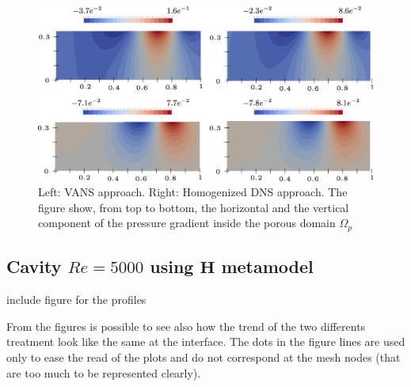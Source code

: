 \begin{figure}[h]
	\centering
	\includegraphics[width=1\linewidth]{chapter_5/figure/re1000/vans_p}
	\caption{Left: VANS approach. Right: Homogenized DNS approach. The figure show, from top to bottom, the horizontal and the vertical component of the pressure gradient inside the porous domain $\Omega_p$}
	\label{fig:1000_p}
\end{figure}


\subsection{Cavity $Re=5000$ using $\mathbf{H}$ metamodel}
\label{pr:mata_cav}

include figure for the profiles


From the figures is possible to see also how the trend of the two differents treatment look like the same at the interface.
The dots in the figure lines are used only to ease the read of the plots and do not correspond at the mesh nodes (that are too much to be represented clearly).

